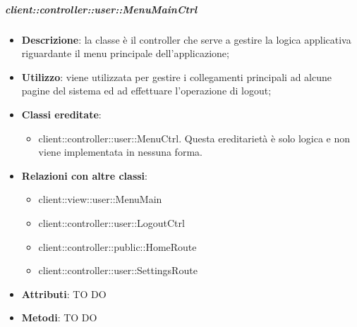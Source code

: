 		\subparagraph{client::controller::user::MenuMainCtrl} %
		\label{subp:client_controller_user_menumainctrl}
			\begin{itemize}
				\item \textbf{Descrizione}: la classe è il controller che serve a gestire la logica applicativa riguardante il menu principale dell'applicazione;
				\item \textbf{Utilizzo}: viene utilizzata per gestire i collegamenti principali ad alcune pagine del sistema ed ad effettuare l'operazione di logout;
				\item \textbf{Classi ereditate}:
					\begin{itemize}
						\item client::controller::user::MenuCtrl. Questa ereditarietà è solo logica e non viene implementata in nessuna forma.
					\end{itemize}
				\item \textbf{Relazioni con altre classi}:
					\begin{itemize}
						\item client::view::user::MenuMain
						\item client::controller::user::LogoutCtrl
						\item client::controller::public::HomeRoute
						\item client::controller::user::SettingsRoute
					\end{itemize}
				\item \textbf{Attributi}: TO DO
				\item \textbf{Metodi}: TO DO
			\end{itemize}

